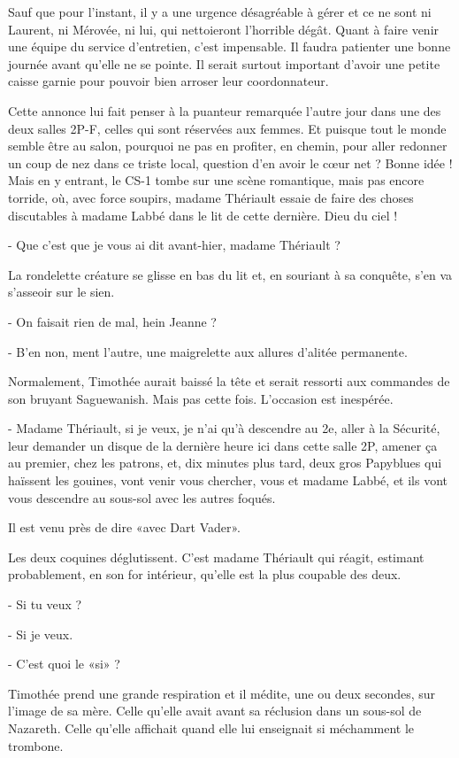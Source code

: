 Sauf que pour l’instant, il y a une urgence désagréable à gérer et ce ne sont ni Laurent, ni Mérovée, ni lui, qui nettoieront l’horrible dégât. Quant à faire venir une équipe du service d’entretien, c’est impensable. Il faudra patienter une bonne journée avant qu’elle ne se pointe. Il serait surtout important d’avoir une petite caisse garnie pour pouvoir bien arroser leur coordonnateur.

Cette annonce lui fait penser à la puanteur remarquée l’autre jour dans une des deux salles 2P-F, celles qui sont réservées aux femmes. Et puisque tout le monde semble être au salon, pourquoi ne pas en profiter, en chemin, pour aller redonner un coup de nez dans ce triste local, question d’en avoir le cœur net ? Bonne idée ! Mais en y entrant, le CS-1 tombe sur une scène romantique, mais pas encore torride, où, avec force soupirs, madame Thériault essaie de faire des choses discutables à madame Labbé dans le lit de cette dernière. Dieu du ciel !

- Que c’est que je vous ai dit avant-hier, madame Thériault ?

La rondelette créature se glisse en bas du lit et, en souriant à sa conquête, s’en va s’asseoir sur le sien.

- On faisait rien de mal, hein Jeanne ?

- B’en non, ment l’autre, une maigrelette aux allures d’alitée permanente.

Normalement, Timothée aurait baissé la tête et serait ressorti aux commandes de son bruyant Saguewanish. Mais pas cette fois. L’occasion est inespérée.

- Madame Thériault, si je veux, je n’ai qu’à descendre au 2e, aller à la Sécurité, leur demander un disque de la dernière heure ici dans cette salle 2P, amener ça au premier, chez les patrons, et, dix minutes plus tard, deux gros Papyblues qui haïssent les gouines, vont venir vous chercher, vous et madame Labbé, et ils vont vous descendre au sous-sol avec les autres foqués.

Il est venu près de dire «avec Dart Vader».

Les deux coquines déglutissent. C’est madame Thériault qui réagit, estimant probablement, en son for intérieur, qu’elle est la plus coupable des deux.

- Si tu veux ?

- Si je veux.

- C’est quoi le «si» ?

Timothée prend une grande respiration et il médite, une ou deux secondes, sur l’image de sa mère. Celle qu’elle avait avant sa réclusion dans un sous-sol de Nazareth. Celle qu’elle affichait quand elle lui enseignait si méchamment le trombone.

